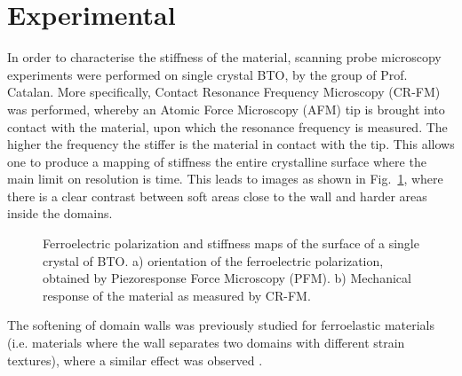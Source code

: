 \section{Experimental}
In order to characterise the stiffness of the material, scanning probe microscopy experiments were performed on single crystal BTO, by the group of Prof. Catalan. More specifically, Contact Resonance Frequency Microscopy (CR-FM) was performed, whereby an Atomic Force Microscopy (AFM) tip is brought into contact with the material, upon which the resonance frequency is measured. The higher the frequency the stiffer is the material in contact with the tip. This allows one to produce a mapping of stiffness the entire crystalline surface where the main limit on resolution is time. This leads to images as shown in Fig.~\ref{fig:BTO_experiment}, where there is a clear contrast between soft areas close to the wall and harder areas inside the domains.
\begin{figure}
	\caption{\label{fig:BTO_experiment} Ferroelectric polarization and stiffness maps of the surface of a single crystal of BTO. a) orientation of the ferroelectric polarization, obtained by Piezoresponse Force Microscopy (PFM). b) Mechanical response of the material as measured by CR-FM.}
\end{figure}
The softening of domain walls was previously studied for ferroelastic materials (i.e. materials where the wall separates two domains with different strain textures), where a similar effect was observed \cite{Lee2003}.


